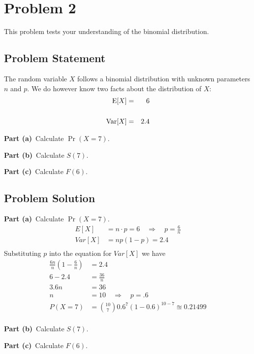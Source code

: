 \documentclass[12pt]{article}
\theoremstyle{definition}
\begin{document}
\newpage
\section*{Problem 2}

This problem tests your understanding of the binomial distribution.

\subsection*{Problem Statement}

The random variable $X$ follows a binomial distribution with unknown parameters $n$ and $p$. We do however know two facts about the distribution of $X$:
\begin{eqnarray*}
\hbox{E}[X] & = & 6\\
\\
\hbox{Var}[X] & = & 2.4
\end{eqnarray*}

\noindent
{\bf Part (a)}\ Calculate $\Pr(X = 7)$.

\bigskip
\noindent
{\bf Part (b)}\ Calculate $S(7)$.

\bigskip
\noindent
{\bf Part (c)}\ Calculate $F(6)$.



\subsection*{Problem Solution}

\noindent
{\bf Part (a)}\ Calculate $\Pr(X = 7)$.
\begin{align*}
E[X] &= n\cdot p = 6 \quad\Rightarrow\quad p =  \frac{6}{n}\\
Var[X] &= np(1-p) = 2.4\\
\end{align*}
Substituting $p$ into the equation for $Var[X]$ we have
\begin{align*}
\frac{6n}{n}(1 - \frac{6}{n}) &= 2.4\\
6 - 2.4 &= \frac{36}{n}\\
3.6n &= 36\\
n &= 10 \quad\Rightarrow\quad p = .6\\
P(X = 7) &= {10 \choose 7}0.6^7(1-0.6)^{10-7} \approxeq 0.21499\\
\end{align*}

\newpage
\noindent
{\bf Part (b)}\ Calculate $S(7)$.


\vspace{4.5in}
{\bf Part (c)}\ Calculate $F(6)$.
\end{document}
